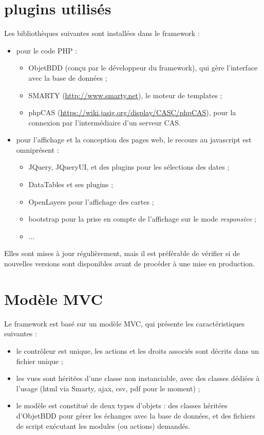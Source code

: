 \section{plugins utilisés}
Les bibliothèques suivantes sont installées dans le framework :
\begin{itemize}
\item pour le code PHP :
\begin{itemize}
\item ObjetBDD (conçu par le développeur du framework), qui gère l'interface avec la base de données ;
\item SMARTY (\url{http://www.smarty.net}), le moteur de templates ;
\item phpCAS (\url{https://wiki.jasig.org/display/CASC/phpCAS}), pour la connexion par l'intermédiaire d'un serveur CAS.

\end{itemize}
\item pour l'affichage et la conception des pages web, le recours au javascript est omniprésent :
\begin{itemize}
\item JQuery, JQueryUI, et des plugins pour les sélections des dates ;
\item DataTables et ses plugins ;
\item OpenLayers pour l'affichage des cartes ;
\item bootstrap pour la prise en compte de l'affichage sur le mode \textit{responsive} ;
\item ...

\end{itemize}
\end{itemize}

Elles sont mises à jour régulièrement, mais il est préférable de vérifier si de nouvelles versions sont disponibles avant de procéder à une mise en production.

\section{Modèle MVC}

Le framework est basé sur un modèle MVC, qui présente les caractéristiques suivantes :
\begin{itemize}
\item le contrôleur est unique, les actions et les droits associés sont décrits dans un fichier unique ;
\item les vues sont héritées d'une classe non instanciable, avec des classes dédiées à l'usage (html via Smarty, ajax, csv, pdf pour le moment) ;
\item le modèle est constitué de deux types d'objets : des classes héritées d'ObjetBDD pour gérer les échanges avec la base de données, et des fichiers de script exécutant les modules (ou actions) demandés.
\end{itemize}

